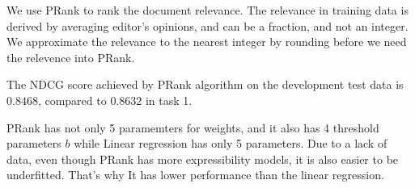 We use PRank to rank the document relevance. The relevance in training data is derived by averaging editor's opinions, and can be a fraction, and not an integer. 
We approximate the relevance to the nearest integer by rounding before we need the relevence into PRank.  

The NDCG score achieved by PRank algorithm on the development test data is $0.8468$, compared to $0.8632$ in task 1.

PRank has not only 5 paramemters for weights, and it also has 4 threshold parameters $b$ while Linear regression has only 5 parameters. 
Due to a lack of data, even though PRank has more expressibility models, it is also easier to be underfitted. That's why It has lower performance than the linear regression. 



